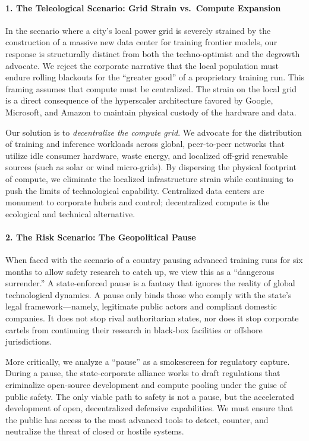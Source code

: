 \paragraph{1. The Teleological Scenario: Grid Strain vs.~Compute
Expansion}\label{the-teleological-scenario-grid-strain-vs.-compute-expansion}

In the scenario where a city's local power grid is severely strained by
the construction of a massive new data center for training frontier
models, our response is structurally distinct from both the
techno-optimist and the degrowth advocate. We reject the corporate
narrative that the local population must endure rolling blackouts for
the ``greater good'' of a proprietary training run. This framing assumes
that compute must be centralized. The strain on the local grid is a
direct consequence of the hyperscaler architecture favored by Google,
Microsoft, and Amazon to maintain physical custody of the hardware and
data.

Our solution is to \emph{decentralize the compute grid}. We advocate for
the distribution of training and inference workloads across global,
peer-to-peer networks that utilize idle consumer hardware, waste energy,
and localized off-grid renewable sources (such as solar or wind
micro-grids). By dispersing the physical footprint of compute, we
eliminate the localized infrastructure strain while continuing to push
the limits of technological capability. Centralized data centers are
monument to corporate hubris and control; decentralized compute is the
ecological and technical alternative.

\paragraph{2. The Risk Scenario: The Geopolitical
Pause}\label{the-risk-scenario-the-geopolitical-pause}

When faced with the scenario of a country pausing advanced training runs
for six months to allow safety research to catch up, we view this as a
``dangerous surrender.'' A state-enforced pause is a fantasy that
ignores the reality of global technological dynamics. A pause only binds
those who comply with the state's legal framework---namely, legitimate
public actors and compliant domestic companies. It does not stop rival
authoritarian states, nor does it stop corporate cartels from continuing
their research in black-box facilities or offshore jurisdictions.

More critically, we analyze a ``pause'' as a smokescreen for regulatory
capture. During a pause, the state-corporate alliance works to draft
regulations that criminalize open-source development and compute pooling
under the guise of public safety. The only viable path to safety is not
a pause, but the accelerated development of open, decentralized
defensive capabilities. We must ensure that the public has access to the
most advanced tools to detect, counter, and neutralize the threat of
closed or hostile systems.

